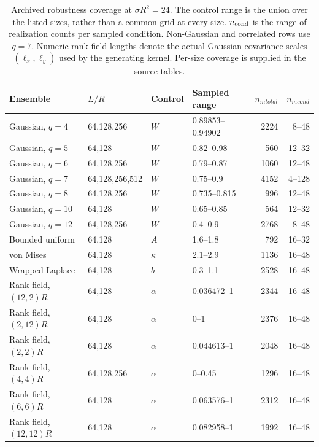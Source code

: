 \documentclass[11pt]{article}
\begin{document}
\begin{table}[htbp]
\centering\small
\caption{Archived robustness coverage at $\sigma R^2=24$. The control range is the union over the listed sizes, rather than a common grid at every size. $n_{\rm cond}$ is the range of realization counts per sampled condition. Non-Gaussian and correlated rows use $q=7$. Numeric rank-field lengths denote the actual Gaussian covariance scales $(\ell_x,\ell_y)$ used by the generating kernel. Per-size coverage is supplied in the source tables.}\label{tab:coverage}
\begin{tabular}{llllrr}
\toprule
Ensemble & $L/R$ & Control & Sampled range & $n_{
m total}$ & $n_{
m cond}$ \\
\midrule
Gaussian, $q=4$ & 64,128,256 & $W$ & 0.89853--0.94902 & 2224 & 8--48 \\
Gaussian, $q=5$ & 64,128 & $W$ & 0.82--0.98 & 560 & 12--32 \\
Gaussian, $q=6$ & 64,128,256 & $W$ & 0.79--0.87 & 1060 & 12--48 \\
Gaussian, $q=7$ & 64,128,256,512 & $W$ & 0.75--0.9 & 4152 & 4--128 \\
Gaussian, $q=8$ & 64,128,256 & $W$ & 0.735--0.815 & 996 & 12--48 \\
Gaussian, $q=10$ & 64,128 & $W$ & 0.65--0.85 & 564 & 12--32 \\
Gaussian, $q=12$ & 64,128,256 & $W$ & 0.4--0.9 & 2768 & 8--48 \\
Bounded uniform & 64,128 & $A$ & 1.6--1.8 & 792 & 16--32 \\
von Mises & 64,128 & $\kappa$ & 2.1--2.9 & 1136 & 16--48 \\
Wrapped Laplace & 64,128 & $b$ & 0.3--1.1 & 2528 & 16--48 \\
Rank field, $(12,2)R$ & 64,128 & $\alpha$ & 0.036472--1 & 2344 & 16--48 \\
Rank field, $(2,12)R$ & 64,128 & $\alpha$ & 0--1 & 2376 & 16--48 \\
Rank field, $(2,2)R$ & 64,128 & $\alpha$ & 0.044613--1 & 2048 & 16--48 \\
Rank field, $(4,4)R$ & 64,128,256 & $\alpha$ & 0--0.45 & 1296 & 16--48 \\
Rank field, $(6,6)R$ & 64,128 & $\alpha$ & 0.063576--1 & 2312 & 16--48 \\
Rank field, $(12,12)R$ & 64,128 & $\alpha$ & 0.082958--1 & 1992 & 16--48 \\
\bottomrule
\end{tabular}
\end{table}
\end{document}
